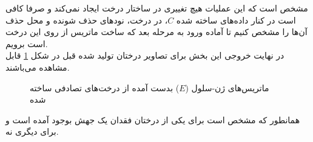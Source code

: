 مشخص است که این عملیات هیچ تغییری در ساختار درخت ایجاد نمی‌کند و صرفا کافی است در کنار داده‌های ساخته شده ‌$C$، در درخت، نودهای حذف شونده و محل حذف آن‌ها را مشخص کنیم تا آماده ورود به مرحله بعد که ساخت ماتریس از روی این درخت است برویم.
\\
در نهایت خروجی این بخش برای تصاویر درختان تولید شده قبل در شکل \ref{fig:E} قابل مشاهده می‌باشند. 
\begin{figure}[!ht]
	\centering
	\hfill
	\caption{ماتریس‌های ژن-سلول ($E$) بدست آمده از درخت‌های تصادفی ساخته شده}
	\label{fig:E}
\end{figure}
همانطور که مشخص است برای یکی از درختان فقدان یک جهش بوجود آمده است و برای دیگری نه. 
